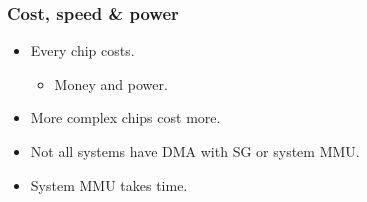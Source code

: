 \begin{frame}
  \frametitle{Cost, speed \& power}

  \begin{itemize}
  \item Every chip costs.
    \begin{itemize}
    \item Money and power.
    \end{itemize}
  \item More complex chips cost more.
  \item Not all systems have DMA with SG or system MMU.
  \item System MMU takes time.
  \end{itemize}
\end{frame}
